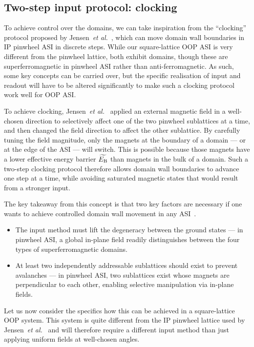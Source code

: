 \subsection{Two-step input protocol: clocking}
To achieve control over the domains, we can take inspiration from the ``clocking'' protocol proposed by Jensen~\textit{et al.}~\cite{clocking-protocol}, which can move domain wall boundaries in IP pinwheel ASI in discrete steps.
While our square-lattice OOP ASI is very different from the pinwheel lattice, both exhibit domains, though these are superferromagnetic in pinwheel ASI rather than anti-ferromagnetic.
As such, some key concepts can be carried over, but the specific realisation of input and readout will have to be altered significantly to make such a clocking protocol work well for OOP ASI. \par
To achieve clocking, Jensen~\textit{et al.}~\cite{clocking-protocol} applied an external magnetic field in a well-chosen direction to selectively affect one of the two pinwheel sublattices at a time, and then changed the field direction to affect the other sublattice.
By carefully tuning the field magnitude, only the magnets at the boundary of a domain --- or at the edge of the ASI --- will switch.
This is possible because those magnets have a lower effective energy barrier $\widetilde{E_\mathrm{B}}$ than magnets in the bulk of a domain.
Such a two-step clocking protocol therefore allows domain wall boundaries to advance one step at a time, while avoiding saturated magnetic states that would result from a stronger input. \par
The key takeaway from this concept is that two key factors are necessary if one wants to achieve controlled domain wall movement in any ASI~\cite{MAES-24}.
\begin{itemize}
	\item The input method must lift the degeneracy between the ground states --- in pinwheel ASI, a global in-plane field readily distinguishes between the four types of superferromagnetic domains.
	\item At least two independently addressable sublattices should exist to prevent avalanches --- in pinwheel ASI, two sublattices exist whose magnets are perpendicular to each other, enabling selective manipulation via in-plane fields.
\end{itemize}
Let us now consider the specifics how this can be achieved in a square-lattice OOP system.
This system is quite different from the IP pinwheel lattice used by Jensen~\textit{et al.}~\cite{clocking-protocol} and will therefore require a different input method than just applying uniform fields at well-chosen angles.


